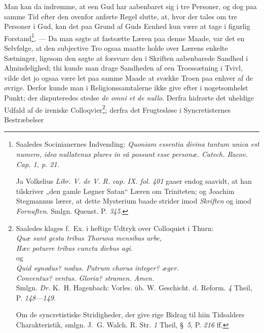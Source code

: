 \documentclass[12pt]{book}
\newcommand{\opage}[1]{\marginnote{\footnotesize\textit{[#1]}}}
\begin{document}
\opage{84} \setcounter{footnote}{0}%
Man kan da indrømme, at een Gud har aabenbaret sig i tre Personer, og dog paa
samme Tid efter den ovenfor anførte Regel slutte, at, hvor der tales om tre
Personer i Gud, kan det paa Grund af Guds Eenhed kun være at tage i figurlig
Forstand\footnote{Saaledes Socinianernes Indvending: \textit{Quoniam essentia
divina tantum unica est numero, ideo nullatenus plures in eâ possunt esse
personæ. Catech. Racov. Cap. 1, p. 21.}

Ja Volkelius \textit{Libr. V. de V. R. cap. IX. fol. 401} gaaer endog
saavidt, at han tilskriver „den gamle Løgner Satan“ Læren om Triniteten; og
Joachim Stegmannus lærer, at dette Mysterium baade strider imod
\emph{Skriften} og imod \emph{Fornuften}. Smlgn. Quenst. P.
\textit{345}.}. --- Da man søgte at fastsætte Læren paa denne Maade, var det
en Selvfølge, at den subjective Tro ogsaa maatte holde over Lærens enkelte
Sætninger, ligesom den søgte at forsvare den i Skriften aabenbarede Sandhed i
Almindelighed; thi kunde man drage Sandheden af een Troessætning i Tvivl,
vilde det jo ogsaa være let paa samme Maade at svække Troen paa enhver af de
øvrige. Derfor kunde man i Religionssamtalerne ikke give efter i
nogetsomhelst Punkt; der disputeredes stedse \textit{de omni et de nullo}.
Derfra hidrørte det uheldige Udfald af de ireniske
Colloqvier\footnote{Saaledes klages f.~Ex. i heftige Udtryk over Colloquiet i
Thurn:\\
\textit{Quæ sunt gesta tribus Thoruna mensibus urbe,}\\
\textit{Hæc potuere tribus cuncta diebus agi.}\\
og\\
\textit{Quid synodus? nodus. Patrum chorus integer? æger.}\\
\textit{Conventus? ventus. Gloria? stramen. Amen.}\\
Smlgn. \textit{Dr.} K.~H. Hagenbach: Vorles. üb. W. Geschicht. d. Reform.
\textit{4} Theil, P. \textit{148---149}.

Om de syncretistiske Stridigheder, der give rige Bidrag til hiin Tidsalders
Charakteristik, smlgn. J.~G. Walch. R. Str. \textit{1} Theil, §~\textit{5},
P. \textit{216} ff.}; derfra det Frugtesløse i Syncretisternes Bestræbelser
\end{document}
